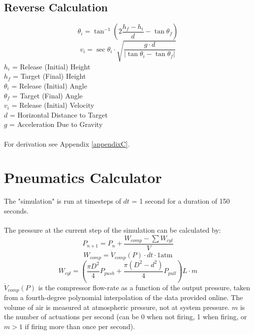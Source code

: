 \documentclass[11pt,a4paper,titlepage]{article}
\begin{document}
	\subsection{Reverse Calculation}
	\begin{equation} \label{proj_init_angle}
	\theta_i = \tan^{-1} \left( 2 \frac{h_f - h_i}{d} - \tan \theta_f \right)
	\end{equation}
	\begin{equation} \label{proj_init_vel}
	v_i = \sec \theta_i \cdot \sqrt{\frac{g \cdot d}{\left| \tan \theta_i - \tan \theta_f \right|}}
	\end{equation}
	$h_i$ = Release (Initial) Height \\
	$h_f$ = Target (Final) Height \\
	$\theta_i$ = Release (Initial) Angle \\
	$\theta_f$ = Target (Final) Angle \\
	$v_i$ = Release	(Initial) Velocity \\
	$d$ = Horizontal Distance to Target \\
	$g$ = Acceleration Due to Gravity\\ \\
	For derivation see Appendix \ref{appendixC}.
	
	\newpage
	\section{Pneumatics Calculator}
	The "simulation" is run at timesteps of $dt$ = 1 second for a duration of 150 seconds. \\ \\
	
	The pressure at the current step of the simulation can be calculated by:
	\begin{equation} \label{pneu_press_timestep}
	P_{n+1} = P_n + \frac{W_{comp} - \sum W_{cyl}}{V}
	\end{equation}
	\begin{equation} \label{pneu_w_comp}
	W_{comp} = \dot{V}_{comp}(P) \cdot dt \cdot 1 \text{atm}
	\end{equation}
	\begin{equation} \label{pneu_w_cyl}
	W_{cyl} = \left( \frac{\pi D^2}{4} P_{push} + \frac{\pi (D^2 - d^2)}{4} P_{pull} \right) L \cdot m
	\end{equation}
	$\dot{V}_{comp}(P)$ is the compressor flow-rate as a function of the output pressure, taken from a fourth-degree polynomial interpolation of the data provided online. The volume of air is measured at atmospheric pressure, not at system pressure. $m$ is the number of actuations per second (can be 0 when not firing, 1 when firing, or $m>1$ if firing more than once per second). \\
	
\end{document}
